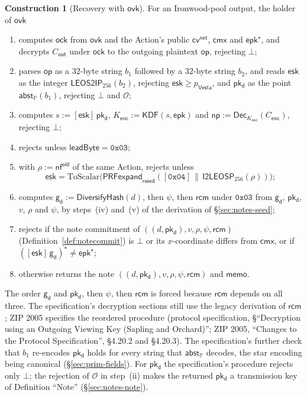 \documentclass[11pt,a4paper]{article}
\theoremstyle{definition}
\newtheorem{construction}[theorem]{Construction}
\newcommand{\PP}{\mathbb{P}}
\newcommand{\nfsym}{\mathsf{nf}}
\newcommand{\cmx}{\mathsf{cmx}}
\newcommand{\cvsym}{\mathsf{cv}}
\newcommand{\Vesta}{\ensuremath{\mathsf{Vesta}}}
\newcommand{\ovk}{\ensuremath{\mathsf{ovk}}}
\newcommand{\pkd}{\ensuremath{\mathsf{pk_d}}}
\newcommand{\gd}{\ensuremath{\mathsf{g_d}}}
\newcommand{\rcm}{\ensuremath{\mathsf{rcm}}}
\begin{document}
\begin{construction}[Recovery with $\ovk$]
For an Ironwood-pool output, the holder of $\ovk$
\begin{enumerate}[label=(\roman*)]
\item computes $\mathsf{ock}$ from $\ovk$ and the Action's public
  $\cvsym^{\mathsf{net}}$, $\cmx$ and $\mathsf{epk}^{\star}$, and
  decrypts $C_{\mathsf{out}}$ under $\mathsf{ock}$ to the outgoing plaintext
  $\mathsf{op}$, rejecting $\bot$;
\item parses $\mathsf{op}$ as a $32$-byte string $b_1$ followed by a
  $32$-byte string $b_2$, and reads $\mathsf{esk}$ as the integer
  $\mathsf{LEOS2IP}_{256}(b_2)$, rejecting $\mathsf{esk} \ge p_{\Vesta}$, and
  $\pkd$ as the point $\mathsf{abst}_{\PP}(b_1)$, rejecting $\bot$ and
  $\mathcal{O}$;
\item computes $s := [\mathsf{esk}]\,\pkd$,
  $K_{\mathsf{enc}} := \mathsf{KDF}(s, \mathsf{epk})$ and
  $\mathsf{np} := \mathsf{Dec}_{K_{\mathsf{enc}}}(C_{\mathsf{enc}})$,
  rejecting $\bot$;
\item rejects unless $\mathsf{leadByte} = \mathtt{0x03}$;
\item with $\rho := \nfsym^{\mathsf{old}}$ of the same Action, rejects unless
  \[
    \mathsf{esk} = \mathrm{ToScalar}\bigl(\mathsf{PRFexpand}_{\mathsf{rseed}}
    ([\mathtt{0x04}] \,\|\, \mathsf{I2LEOSP}_{256}(\rho))\bigr);
  \]
\item computes $\gd := \mathsf{DiversifyHash}(d)$, then $\psi$, then $\rcm$
  under $\mathtt{0x03}$ from $\gd$, $\pkd$, $v$, $\rho$ and $\psi$, by
  steps~(iv) and~(v) of the derivation of \S\ref{sec:notes-seed};
\item rejects if the note commitment of $((d, \pkd), v, \rho, \psi, \rcm)$
  (Definition~\ref{def:notecommit}) is $\bot$ or its $x$-coordinate differs
  from $\cmx$, or if $([\mathsf{esk}]\,\gd)^{\star} \neq
  \mathsf{epk}^{\star}$;
\item otherwise returns the note $((d, \pkd), v, \rho, \psi, \rcm)$ and
  $\mathsf{memo}$.
\end{enumerate}
The order $\gd$ and $\pkd$, then $\psi$, then $\rcm$ is forced because
$\rcm$ depends on all three. The specification's decryption sections still
use the legacy derivation of $\rcm$; ZIP 2005 specifies the reordered
procedure (protocol specification, \S``Decryption using an Outgoing Viewing
Key (Sapling and Orchard)''; ZIP 2005, ``Changes to the Protocol
Specification'', \S 4.20.2 and \S 4.20.3). The specification's further check
that $b_1$ re-encodes $\pkd$ holds for every string that
$\mathsf{abst}_{\PP}$ decodes, the star encoding being canonical
(\S\ref{sec:prim-fields}). For $\pkd$ the specification's procedure rejects
only $\bot$; the rejection of $\mathcal{O}$ in step~(ii) makes the returned
$\pkd$ a transmission key of Definition ``Note'' (\S\ref{sec:notes-note}).
\end{construction}
\end{document}
